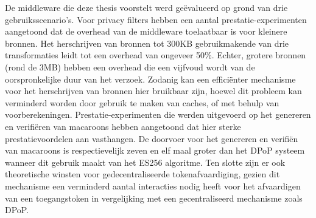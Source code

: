 \begin{abstract*}
  De middleware die deze thesis voorstelt werd ge{\"e}valueerd op grond van drie gebruiksscenario's. Voor privacy filters hebben een aantal prestatie-experimenten aangetoond dat de overhead van de middleware toelaatbaar is voor kleinere bronnen. Het herschrijven van bronnen tot 300KB gebruikmakende van drie transformaties leidt tot een overhead van ongeveer 50\%. Echter, grotere bronnen (rond de 3MB) hebben een overhead die een vijfvoud wordt van de oorspronkelijke duur van het verzoek. Zodanig kan een effici{\"e}nter mechanisme voor het herschrijven van bronnen hier bruikbaar zijn, hoewel dit probleem kan verminderd worden door gebruik te maken van caches, of met behulp van voorberekeningen. Prestatie-experimenten die werden uitgevoerd op het genereren en verifi{\"e}ren van macaroons hebben aangetoond dat hier sterke prestatievoordelen aan vasthangen. De doorvoer voor het genereren en verifi{\"e}n van macaroons is respectievelijk zeven en elf maal groter dan het \acrshort{DPoP} systeem wanneer dit gebruik maakt van het ES256 algoritme. Ten slotte zijn er ook theoretische winsten voor gedecentraliseerde tokenafvaardiging, gezien dit mechanisme een verminderd aantal interacties nodig heeft voor het afvaardigen van een toegangstoken in vergelijking met een gecentraliseerd mechanisme zoals \acrshort{DPoP}.
\end{abstract*}
